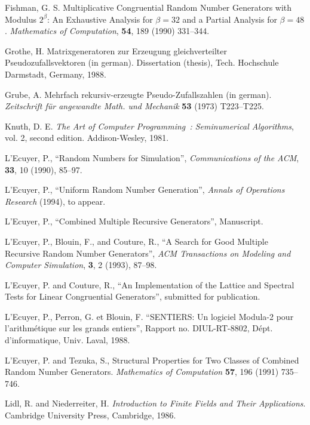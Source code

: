 \begin {refer}
 Fishman, G. S.
Multiplicative Congruential Random Number Generators with Modulus $2^\beta$:
An Exhaustive Analysis for $\beta=32$ and a Partial Analysis for $\beta=48$.
{\em Mathematics of Computation}, {\bf 54}, 189 (1990) 331--344.

 Grothe, H. Matrixgeneratoren zur Erzeugung gleichverteilter
Pseudozufallsvektoren (in german).
Dissertation (thesis), Tech. Hochschule Darmstadt, Germany, 1988.

 Grube, A.  Mehrfach rekursiv-erzeugte Pseudo-Zufallszahlen
(in german). {\it Zeitsch\-rift f\"ur angewandte Math. und
Mechanik\/} {\bf 53} (1973) T223--T225.


 Knuth, D. E.
{\it The Art of Computer Programming~: Seminumerical
Algorithms\/}, vol. 2, second edition. Ad\-di\-son-Wesley, 1981.

 L'Ecuyer, P.,
``Random Numbers for Simulation'',
{\em Communications of the ACM\/}, {\bf 33}, 10 (1990), 85--97.

 L'Ecuyer, P.,
``Uniform Random Number Generation'',
{\em Annals of Operations Research\/} (1994), to appear.

 L'Ecuyer, P.,
``Combined Multiple Recursive Generators'', Manuscript.

 L'Ecuyer, P., Blouin, F., and Couture, R.,
``A Search for Good Multiple Recursive Random Number Generators'',
{\em ACM Transactions on Modeling and Computer Simulation\/},
{\bf 3}, 2 (1993), 87--98.

 L'Ecuyer, P. and Couture, R.,
``An Implementation of the Lattice and Spectral Tests for Linear
Congruential Generators'', submitted for publication.

 L'Ecuyer, P., Perron, G. et Blouin, F.
``SENTIERS: Un logiciel Modula-2 pour l'arithm\'e\-ti\-que sur les grands
entiers'', Rapport no. DIUL-RT-8802, D\'ept. d'informatique, Univ. Laval, 1988.

 L'Ecuyer, P. and Tezuka, S.,
Structural Properties for Two Classes of Combined Random Number Generators.
{\em Mathematics of Computation\/} {\bf 57}, 196 (1991) 735--746.

 Lidl, R. and Niederreiter, H.
{\it Introduction to Finite Fields and Their Applications\/}.
Cambridge University Press, Cambridge, 1986.


\end{refer}
